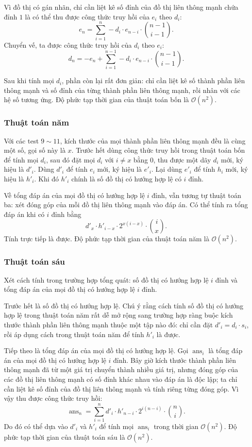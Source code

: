 \documentclass[11pt]{article}
\newcommand{\Oh}{\mathcal{O}}
\begin{document}
Vì đồ thị có gán nhãn, chỉ cần liệt kê số đỉnh của đồ thị liên thông mạnh chứa
đỉnh \(1\) là có thể thu được công thức truy hồi của \(e_i\) theo \(d_i\):
\[
  e_n=\sum_{i=1}^{n}
    -d_i\cdot e_{n-i}\cdot \binom{n-1}{i-1}.
\]
Chuyển vế, ta được công thức truy hồi của \(d_i\) theo \(e_i\):
\[
  d_n=-e_n+
  \sum_{i=1}^{n-1}-d_i\cdot e_{n-i}\cdot \binom{n-1}{i-1}.
\]

Sau khi tính mọi \(d_i\), phần còn lại rất đơn giản: chỉ cần liệt kê số thành
phần liên thông mạnh và số đỉnh của từng thành phần liên thông mạnh, rồi nhân
với các hệ số tương ứng. Độ phức tạp thời gian của thuật toán bốn là
\(\Oh(n^2)\).

\subsubsection{Thuật toán năm}

Với các test \(9\sim 11\), kích thước của mọi thành phần liên thông mạnh đều
là cùng một số, gọi số này là \(x\). Trước hết dùng công thức truy hồi trong
thuật toán bốn để tính mọi \(d_i\), sau đó đặt mọi \(d_i\) với \(i\ne x\) bằng
\(0\), thu được một dãy \(d_i\) mới, ký hiệu là \(d'_i\). Dùng \(d'_i\) để
tính \(e_i\) mới, ký hiệu là \(e'_i\). Lại dùng \(e'_i\) để tính \(h_i\) mới,
ký hiệu là \(h'_i\). Khi đó \(h'_i\) chính là số đồ thị có hướng hợp lệ có
\(i\) đỉnh.

Về tổng đáp án của mọi đồ thị có hướng hợp lệ \(i\) đỉnh, vẫn tương tự thuật
toán ba: xét đóng góp của mỗi đồ thị liên thông mạnh vào đáp án. Có thể tính
ra tổng đáp án khi có \(i\) đỉnh bằng
\[
  d'_x\cdot h'_{i-x}\cdot 2^{x(i-x)}\cdot \binom{i}{x}.
\]
Tính trực tiếp là được. Độ phức tạp thời gian của thuật toán năm là
\(\Oh(n^2)\).

\subsubsection{Thuật toán sáu}

Xét cách tính trong trường hợp tổng quát: số đồ thị có hướng hợp lệ \(i\) đỉnh
và tổng đáp án của mọi đồ thị có hướng hợp lệ \(i\) đỉnh.

Trước hết là số đồ thị có hướng hợp lệ. Chú ý rằng cách tính số đồ thị có
hướng hợp lệ trong thuật toán năm rất dễ mở rộng sang trường hợp ràng buộc
kích thước thành phần liên thông mạnh thuộc một tập nào đó: chỉ cần đặt
\(d'_i=d_i\cdot s_i\), rồi áp dụng cách trong thuật toán năm để tính \(h'_i\)
là được.

Tiếp theo là tổng đáp án của mọi đồ thị có hướng hợp lệ. Gọi \(\operatorname{ans}_i\)
là tổng đáp án của mọi đồ thị có hướng hợp lệ \(i\) đỉnh. Bây giờ kích thước
thành phần liên thông mạnh đã từ một giá trị chuyển thành nhiều giá trị, nhưng
đóng góp của các đồ thị liên thông mạnh có số đỉnh khác nhau vào đáp án là độc
lập; ta chỉ cần liệt kê số đỉnh của đồ thị liên thông mạnh và tính riêng từng
đóng góp. Vì vậy thu được công thức truy hồi:
\[
  \operatorname{ans}_n=
  \sum_{i=1}^{n}d'_i\cdot h'_{n-i}\cdot 2^{i(n-i)}\cdot \binom{n}{i}.
\]
Do đó có thể dựa vào \(d'_i\) và \(h'_i\) để tính mọi \(\operatorname{ans}_i\)
trong thời gian \(\Oh(n^2)\). Độ phức tạp thời gian của thuật toán sáu là
\(\Oh(n^2)\).
\end{document}
